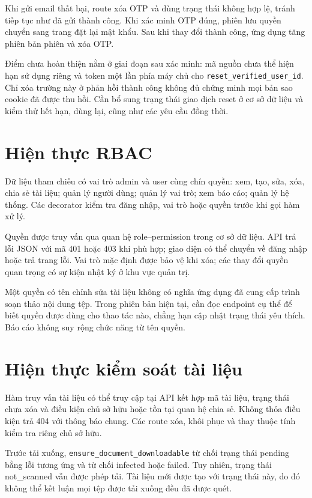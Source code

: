 Khi gửi email thất bại, route xóa OTP và dùng trạng thái không hợp lệ, tránh tiếp tục như đã gửi thành công. Khi xác minh OTP đúng, phiên lưu quyền chuyển sang trang đặt lại mật khẩu. Sau khi thay đổi thành công, ứng dụng tăng phiên bản phiên và xóa OTP.

Điểm chưa hoàn thiện nằm ở giai đoạn sau xác minh: mã nguồn chưa thể hiện hạn sử dụng riêng và token một lần phía máy chủ cho \texttt{reset\_verified\_user\_id}. Chỉ xóa trường này ở phản hồi thành công không đủ chứng minh mọi bản sao cookie đã được thu hồi. Cần bổ sung trạng thái giao dịch reset ở cơ sở dữ liệu và kiểm thử hết hạn, dùng lại, cũng như các yêu cầu đồng thời.

\section{Hiện thực RBAC}
Dữ liệu tham chiếu có vai trò admin và user cùng chín quyền: xem, tạo, sửa, xóa, chia sẻ tài liệu; quản lý người dùng; quản lý vai trò; xem báo cáo; quản lý hệ thống. Các decorator kiểm tra đăng nhập, vai trò hoặc quyền trước khi gọi hàm xử lý.

Quyền được truy vấn qua quan hệ role--permission trong cơ sở dữ liệu. API trả lỗi JSON với mã 401 hoặc 403 khi phù hợp; giao diện có thể chuyển về đăng nhập hoặc trả trang lỗi. Vai trò mặc định được bảo vệ khi xóa; các thay đổi quyền quan trọng có sự kiện nhật ký ở khu vực quản trị.

Một quyền có tên chỉnh sửa tài liệu không có nghĩa ứng dụng đã cung cấp trình soạn thảo nội dung tệp. Trong phiên bản hiện tại, cần đọc endpoint cụ thể để biết quyền được dùng cho thao tác nào, chẳng hạn cập nhật trạng thái yêu thích. Báo cáo không suy rộng chức năng từ tên quyền.

\section{Hiện thực kiểm soát tài liệu}
Hàm truy vấn tài liệu có thể truy cập tại API kết hợp mã tài liệu, trạng thái chưa xóa và điều kiện chủ sở hữu hoặc tồn tại quan hệ chia sẻ. Không thỏa điều kiện trả 404 với thông báo chung. Các route xóa, khôi phục và thay thuộc tính kiểm tra riêng chủ sở hữu.

Trước tải xuống, \texttt{ensure\_document\_downloadable} từ chối trạng thái pending bằng lỗi tương ứng và từ chối infected hoặc failed. Tuy nhiên, trạng thái not\_scanned vẫn được phép tải. Tài liệu mới được tạo với trạng thái này, do đó không thể kết luận mọi tệp được tải xuống đều đã được quét.

